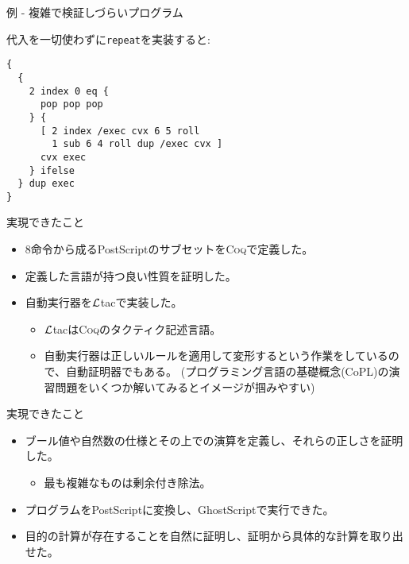 \documentclass[cjk, 14pt, dvipdfm]{beamer}
\newcommand{\Coq}{{\scshape{}Coq}}
\newcommand{\Ltac}{\mbox{\emph{$\cal L$}tac}}
\begin{document}
\begin{frame}[fragile]{例 - 複雑で検証しづらいプログラム}

  代入を一切使わずに\texttt{repeat}を実装すると:

{ \small
\begin{verbatim}
{
  {
    2 index 0 eq {
      pop pop pop
    } {
      [ 2 index /exec cvx 6 5 roll
        1 sub 6 4 roll dup /exec cvx ]
      cvx exec
    } ifelse
  } dup exec
}
\end{verbatim} }

\end{frame}

\begin{frame}{実現できたこと}

  \begin{itemize}
    \item 8命令から成るPostScriptのサブセットを\Coq{}で定義した。
    \item 定義した言語が持つ良い性質を証明した。
    \item 自動実行器を\Ltac{}で実装した。
    \begin{itemize}
      \item \Ltac{}は\Coq{}のタクティク記述言語。
      \item 自動実行器は正しいルールを適用して変形するという作業をしているので、自動証明器でもある。
            (プログラミング言語の基礎概念(CoPL)の演習問題をいくつか解いてみるとイメージが掴みやすい)
    \end{itemize}
  \end{itemize}

\end{frame}

\begin{frame}{実現できたこと}

  \begin{itemize}
    \item ブール値や自然数の仕様とその上での演算を定義し、それらの正しさを証明した。
    \begin{itemize}
      \item 最も複雑なものは剰余付き除法。
    \end{itemize}
    \item プログラムをPostScriptに変換し、GhostScriptで実行できた。
    \item 目的の計算が存在することを自然に証明し、証明から具体的な計算を取り出せた。
  \end{itemize}

\end{frame}
\end{document}
